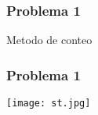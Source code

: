 \documentclass{beamer}
\begin{document}
\begin{frame}
\frametitle{Problema 1}
\begin{algorithm}[H]
\caption{Metodo de conteo}

\frametitle{Problema 1}
 \textbf{}
 \newline
 \newline

\texttt{[image: st.jpg]}

\end{algorithm}
\end{frame}
\end{document}
